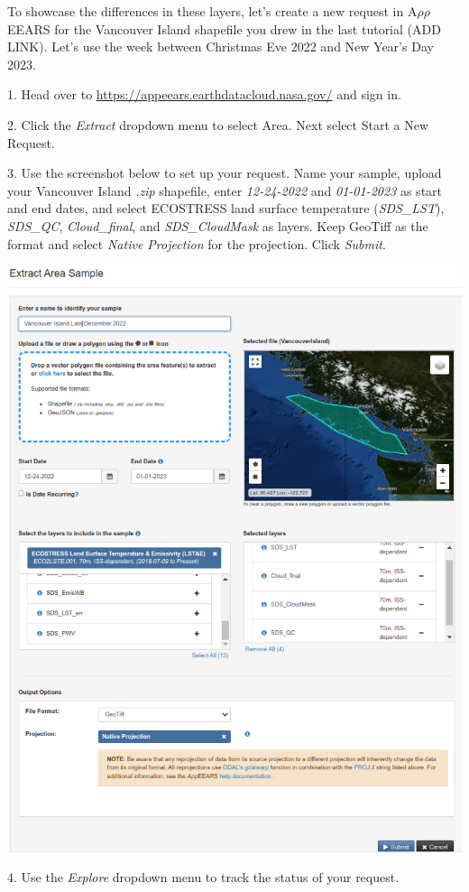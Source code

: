 \documentclass[oneside,a4paper,11pt,explicit]{book}
\begin{document}
	\vspace*{.75em}
	
	To showcase the differences in these layers, let's create a new request in A$\rho\rho$EEARS for the Vancouver Island shapefile you drew in the last tutorial (ADD LINK). Let's use the week between Christmas Eve 2022 and New Year's Day 2023.
	
	1. Head over to \href{https://appeears.earthdatacloud.nasa.gov/}{https://appeears.earthdatacloud.nasa.gov/} and sign in.
	
	2. Click the \textit{Extract} dropdown menu to select Area. Next select Start a New Request.
	
	3. Use the screenshot below to set up your request. Name your sample, upload your Vancouver Island \textit{.zip} shapefile, enter \textit{12-24-2022} and \textit{01-01-2023} as start and end dates, and select ECOSTRESS land surface temperature (\textit{SDS\_LST}), \textit{SDS\_QC}, \textit{Cloud\_final}, and \textit{SDS\_CloudMask} as layers. Keep GeoTiff as the format and select \textit{Native Projection} for the projection. Click \textit{Submit}.
	
	\centerline{\includegraphics[width=.75\textwidth]{ExtractVancouver.png}}
	
	4. Use the \textit{Explore} dropdown menu to track the status of your request. 
	
	\vspace{.25em}
	
\end{document}
